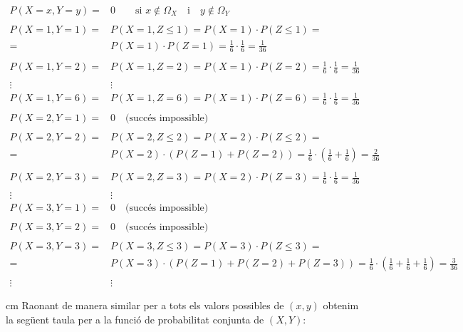 \documentclass{article}
\begin{document}
\[
\begin{array}{rl}
P(X=x, Y=y)=& 0 \qquad \text{si } x\notin \Omega_X \quad \text{i} \quad y\notin \Omega_Y \\ \\
P(X=1, Y=1)=& P(X=1, Z \leq 1)=P(X=1)\cdot P(Z\leq 1) = \\ 
           =&P(X=1) \cdot P(Z=1)= \frac{1}{6} \cdot \frac{1}{6} =\frac{1}{36} \\ \\
P(X=1, Y=2)=& P(X=1, Z=2)=P(X=1)\cdot P(Z=2) =\frac{1}{6} \cdot \frac{1}{6} =\frac{1}{36} \\ \\
\vdots & \vdots \\
P(X=1, Y=6)=& P(X=1, Z=6)=P(X=1)\cdot P(Z=6) =\frac{1}{6} \cdot \frac{1}{6} =\frac{1}{36} \\ \\
P(X=2, Y=1)=&0 \quad \text{(succ\'es impossible)} \\ \\
P(X=2, Y=2)=& P(X=2, Z \leq 2)=P(X=2)\cdot P(Z\leq 2) = \\ 
           =&P(X=2) \cdot (P(Z=1)+P(Z=2))= \frac{1}{6} \cdot (\frac{1}{6}+\frac{1}{6}) =\frac{2}{36} \\ \\
P(X=2, Y=3)=& P(X=2, Z=3)=P(X=2)\cdot P(Z=3) =\frac{1}{6} \cdot \frac{1}{6} =\frac{1}{36} \\ \\
\vdots & \vdots \\
P(X=3, Y=1)=&0 \quad \text{(succ\'es impossible)} \\ \\
P(X=3, Y=2)=&0 \quad \text{(succ\'es impossible)} \\ \\
P(X=3, Y=3)=& P(X=3, Z \leq 3)=P(X=3)\cdot P(Z\leq 3) = \\ 
           =& P(X=3) \cdot (P(Z=1)+P(Z=2)+P(Z=3))= \frac{1}{6} \cdot (\frac{1}{6}+\frac{1}{6}+\frac{1}{6}) =\frac{3}{36} \\ \\
\vdots & \vdots 
\end{array}
\]

 cm
\noindent
Raonant de manera similar per a tots els valors possibles de $(x, y)$ obtenim la seg\"uent taula per 
a la funci\'o de probabilitat conjunta de $(X, Y)$:
\end{document}
